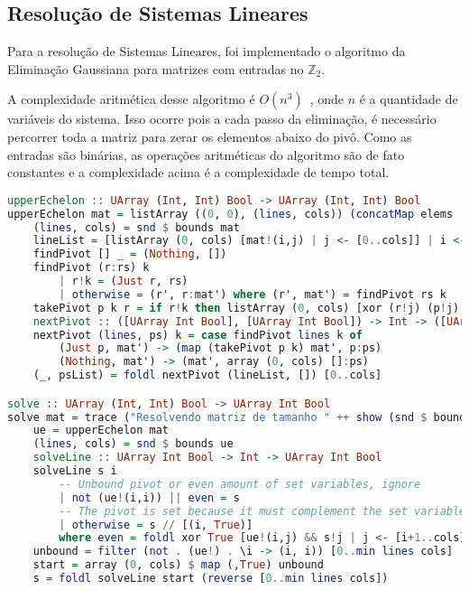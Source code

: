 \documentclass{article}
\begin{document}
\subsection{Resolução de Sistemas Lineares}
\label{matrixSolver}

Para a resolução de Sistemas Lineares, foi implementado o algoritmo da Eliminação Gaussiana para matrizes com entradas no $\mathbb{Z}_2$.

A complexidade aritmética desse algoritmo é $O(n^3)$~\cite{Farebrother_1988}, onde $n$ é a quantidade de variáveis do sistema.
Isso ocorre pois a cada passo da eliminação, é necessário percorrer toda a matriz para zerar os elementos abaixo do pivô.
Como as entradas são binárias, as operações aritméticas do algoritmo são de fato constantes e a complexidade acima é a complexidade de tempo total.

\begin{minipage}{.9\linewidth}
\begin{lstlisting}[language=haskell,caption=Eliminação Gaussiana]
upperEchelon :: UArray (Int, Int) Bool -> UArray (Int, Int) Bool
upperEchelon mat = listArray ((0, 0), (lines, cols)) (concatMap elems . reverse $ psList) where
    (lines, cols) = snd $ bounds mat
    lineList = [listArray (0, cols) [mat!(i,j) | j <- [0..cols]] | i <- [0..lines]]
    findPivot [] _ = (Nothing, [])
    findPivot (r:rs) k
        | r!k = (Just r, rs)
        | otherwise = (r', r:mat') where (r', mat') = findPivot rs k
    takePivot p k r = if r!k then listArray (0, cols) [xor (r!j) (p!j) | j <- [0..cols]] else r
    nextPivot :: ([UArray Int Bool], [UArray Int Bool]) -> Int -> ([UArray Int Bool], [UArray Int Bool])
    nextPivot (lines, ps) k = case findPivot lines k of
        (Just p, mat') -> (map (takePivot p k) mat', p:ps)
        (Nothing, mat') -> (mat', array (0, cols) []:ps)
    (_, psList) = foldl nextPivot (lineList, []) [0..cols]

solve :: UArray (Int, Int) Bool -> UArray Int Bool
solve mat = trace ("Resolvendo matriz de tamanho " ++ show (snd $ bounds mat)) s where
    ue = upperEchelon mat
    (lines, cols) = snd $ bounds ue
    solveLine :: UArray Int Bool -> Int -> UArray Int Bool
    solveLine s i
        -- Unbound pivot or even amount of set variables, ignore
        | not (ue!(i,i)) || even = s
        -- The pivot is set because it must complement the set variables and result in zero
        | otherwise = s // [(i, True)]
        where even = foldl xor True [ue!(i,j) && s!j | j <- [i+1..cols]]
    unbound = filter (not . (ue!) . \i -> (i, i)) [0..min lines cols]
    start = array (0, cols) $ map (,True) unbound
    s = foldl solveLine start (reverse [0..min lines cols])

\end{lstlisting}
\end{minipage}
\end{document}
